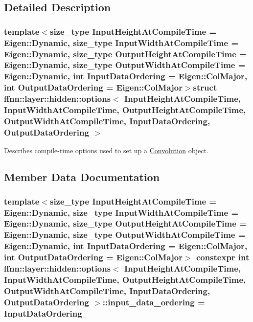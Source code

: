 \subsection{Detailed Description}
\subsubsection*{template$<$size\-\_\-type Input\-Height\-At\-Compile\-Time = Eigen\-::\-Dynamic, size\-\_\-type Input\-Width\-At\-Compile\-Time = Eigen\-::\-Dynamic, size\-\_\-type Output\-Height\-At\-Compile\-Time = Eigen\-::\-Dynamic, size\-\_\-type Output\-Width\-At\-Compile\-Time = Eigen\-::\-Dynamic, int Input\-Data\-Ordering = Eigen\-::\-Col\-Major, int Output\-Data\-Ordering = Eigen\-::\-Col\-Major$>$struct ffnn\-::layer\-::hidden\-::options$<$ Input\-Height\-At\-Compile\-Time, Input\-Width\-At\-Compile\-Time, Output\-Height\-At\-Compile\-Time, Output\-Width\-At\-Compile\-Time, Input\-Data\-Ordering, Output\-Data\-Ordering $>$}

Describes compile-\/time options used to set up a \hyperlink{classffnn_1_1layer_1_1_convolution}{Convolution} object. 

\subsection{Member Data Documentation}
\hypertarget{structffnn_1_1layer_1_1hidden_1_1options_acc5fb3b7db8c64263825566a0b9d4d02}{
\subsubsection[{input\-\_\-data\-\_\-ordering}]{\setlength{\rightskip}{0pt plus 5cm}template$<$size\-\_\-type Input\-Height\-At\-Compile\-Time = Eigen\-::\-Dynamic, size\-\_\-type Input\-Width\-At\-Compile\-Time = Eigen\-::\-Dynamic, size\-\_\-type Output\-Height\-At\-Compile\-Time = Eigen\-::\-Dynamic, size\-\_\-type Output\-Width\-At\-Compile\-Time = Eigen\-::\-Dynamic, int Input\-Data\-Ordering = Eigen\-::\-Col\-Major, int Output\-Data\-Ordering = Eigen\-::\-Col\-Major$>$ constexpr int {\bf ffnn\-::layer\-::hidden\-::options}$<$ Input\-Height\-At\-Compile\-Time, Input\-Width\-At\-Compile\-Time, Output\-Height\-At\-Compile\-Time, Output\-Width\-At\-Compile\-Time, Input\-Data\-Ordering, Output\-Data\-Ordering $>$\-::input\-\_\-data\-\_\-ordering = Input\-Data\-Ordering\hspace{0.3cm}{\ttfamily [static]}}}\label{structffnn_1_1layer_1_1hidden_1_1options_acc5fb3b7db8c64263825566a0b9d4d02}


